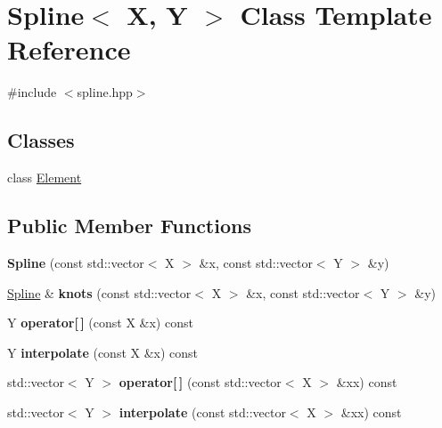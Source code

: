 \hypertarget{classSpline}{\section{Spline$<$ X, Y $>$ Class Template Reference}
\label{classSpline}
}


{\ttfamily \#include $<$spline.\-hpp$>$}

\subsection*{Classes}
\begin{DoxyCompactItemize}
\item 
class \hyperlink{classSpline_1_1Element}{Element}
\end{DoxyCompactItemize}
\subsection*{Public Member Functions}
\begin{DoxyCompactItemize}
\item 
\hypertarget{classSpline_a9202b2897674c1877b2287f83a3079e9}{{\bfseries Spline} (const std\-::vector$<$ X $>$ \&x, const std\-::vector$<$ Y $>$ \&y)}\label{classSpline_a9202b2897674c1877b2287f83a3079e9}

\item 
\hypertarget{classSpline_a5297f90ac8e0b4758e88b7b4cecf2633}{\hyperlink{classSpline}{Spline} \& {\bfseries knots} (const std\-::vector$<$ X $>$ \&x, const std\-::vector$<$ Y $>$ \&y)}\label{classSpline_a5297f90ac8e0b4758e88b7b4cecf2633}

\item 
\hypertarget{classSpline_a52fd94178e1e0cb612bdb018acc1fee6}{Y {\bfseries operator\mbox{[}$\,$\mbox{]}} (const X \&x) const }\label{classSpline_a52fd94178e1e0cb612bdb018acc1fee6}

\item 
\hypertarget{classSpline_ad8594d762a6673e573d38aba5bef70ec}{Y {\bfseries interpolate} (const X \&x) const }\label{classSpline_ad8594d762a6673e573d38aba5bef70ec}

\item 
\hypertarget{classSpline_abdd648dce89434bacb38309eadf13106}{std\-::vector$<$ Y $>$ {\bfseries operator\mbox{[}$\,$\mbox{]}} (const std\-::vector$<$ X $>$ \&xx) const }\label{classSpline_abdd648dce89434bacb38309eadf13106}

\item 
\hypertarget{classSpline_aec162530d74514a6bc57d1cd8d7fe116}{std\-::vector$<$ Y $>$ {\bfseries interpolate} (const std\-::vector$<$ X $>$ \&xx) const }\label{classSpline_aec162530d74514a6bc57d1cd8d7fe116}

\end{DoxyCompactItemize}
